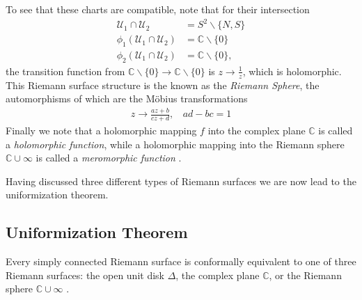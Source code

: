 \documentclass[lettersize,12pt]{article}
\begin{document}
To see that these charts are compatible, note that for their intersection
	\begin{equation}
	\begin{aligned}
		\mathcal{U}_{1}\cap \mathcal{U}_{2}&=S^2\backslash\{N,S\}\\
		\phi_1(\mathcal{U}_{1}\cap \mathcal{U}_{2})&=\mathds{C}\backslash\{0\}\\
		\phi_2(\mathcal{U}_{1}\cap \mathcal{U}_{2})&=\mathds{C}\backslash\{0\},
	\end{aligned}
\end{equation}
the transition function from $\mathds{C}\backslash\{0\}\to \mathds{C}\backslash\{0\}$ is $z\to \frac{1}{z}$, which is holomorphic. This Riemann surface structure is the known as the \textit{Riemann Sphere}, the automorphisms of which are the Möbius transformations
\begin{equation}
	\begin{aligned}
		z\to \frac{az+b}{cz+d},~~~~ad-bc=1
	\end{aligned}
\end{equation} 
Finally we note that a holomorphic mapping $f$ into the complex plane $\mathds{C}$ is called a \textit{holomorphic function}, while a holomorphic mapping into the Riemann sphere $\mathds{C}\cup\infty$ is called a \textit{meromorphic function} \cite{Farkas}. 

Having discussed three different types of Riemann surfaces we are now lead to the uniformization theorem.
\subsection{Uniformization Theorem} \label{sec:uni}
	Every simply connected Riemann surface is conformally equivalent to one of three Riemann surfaces: the open unit disk $\Delta$, the complex plane $\mathds{C}$, or the Riemann sphere $\mathds{C}\cup \infty$ \cite{Farkas}.
\end{document}
